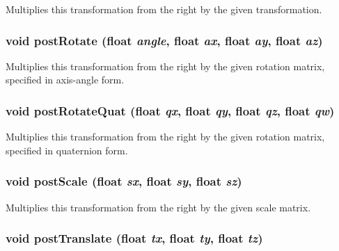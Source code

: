 Multiplies this transformation from the right by the given transformation. \hypertarget{classm3g_1_1Transform_4abf135257f132cdf9580f3a3e11ea6c}{
\subsubsection[{postRotate}]{\setlength{\rightskip}{0pt plus 5cm}void postRotate (float {\em angle}, \/  float {\em ax}, \/  float {\em ay}, \/  float {\em az})}}
\label{classm3g_1_1Transform_4abf135257f132cdf9580f3a3e11ea6c}


Multiplies this transformation from the right by the given rotation matrix, specified in axis-angle form. \hypertarget{classm3g_1_1Transform_7ce6ca00ac17bc4bb5f271c48da5e2dc}{
\subsubsection[{postRotateQuat}]{\setlength{\rightskip}{0pt plus 5cm}void postRotateQuat (float {\em qx}, \/  float {\em qy}, \/  float {\em qz}, \/  float {\em qw})}}
\label{classm3g_1_1Transform_7ce6ca00ac17bc4bb5f271c48da5e2dc}


Multiplies this transformation from the right by the given rotation matrix, specified in quaternion form. \hypertarget{classm3g_1_1Transform_4cbb4aa3878b658da54a144896f71446}{
\subsubsection[{postScale}]{\setlength{\rightskip}{0pt plus 5cm}void postScale (float {\em sx}, \/  float {\em sy}, \/  float {\em sz})}}
\label{classm3g_1_1Transform_4cbb4aa3878b658da54a144896f71446}


Multiplies this transformation from the right by the given scale matrix. \hypertarget{classm3g_1_1Transform_638498b811d6ccdf60b7f1f3de157ed6}{
\subsubsection[{postTranslate}]{\setlength{\rightskip}{0pt plus 5cm}void postTranslate (float {\em tx}, \/  float {\em ty}, \/  float {\em tz})}}
\label{classm3g_1_1Transform_638498b811d6ccdf60b7f1f3de157ed6}


